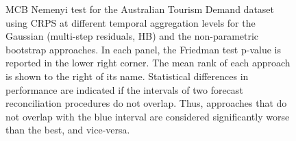 \documentclass[review, 11pt]{elsarticle}
\theoremstyle{definition}
\newcommand{\figuretag}[1]{%
  \addtocounter{figure}{-1}%
  \renewcommand{\thefigure}{#1}%
  \renewcommand{\theHfigure}{#1}%
}
\begin{document}
\begin{figure}[p]
	\figuretag{9-old}
	\caption{\color{red}MCB Nemenyi test for the Australian Tourism Demand dataset using CRPS at different temporal aggregation levels for the Gaussian (multi-step residuals, HB) and the non-parametric bootstrap approaches. In each panel, the Friedman test p-value is reported in the lower right corner. The mean rank of each approach is shown to the right of its name. Statistical differences in performance are indicated if the intervals of two forecast reconciliation procedures do not overlap. Thus, approaches that do not overlap with the blue interval are considered significantly worse than the best, and vice-versa.}
	\label{fig:vnmcb-old}
\end{figure}
\end{document}
